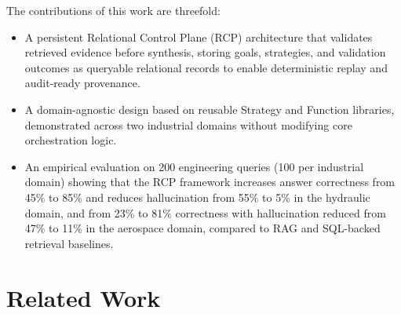 \documentclass[largeformat]{interact}
\begin{document}
\vspace{1em}
\noindent The contributions of this work are threefold:
\begin{itemize}[label=-]
    \item A persistent Relational Control Plane (RCP) architecture that validates retrieved evidence before synthesis, storing goals, strategies, and validation outcomes as queryable relational records to enable deterministic replay and audit-ready provenance.
    \item A domain-agnostic design based on reusable Strategy and Function libraries, demonstrated across two industrial domains without modifying core orchestration logic.
     \item An empirical evaluation on 200 engineering queries (100 per industrial domain) showing that the RCP framework increases answer correctness from 45\% to 85\% and reduces hallucination from 55\% to 5\% in the hydraulic domain, and from 23\% to 81\% correctness with hallucination reduced from 47\% to 11\% in the aerospace domain, compared to RAG and SQL-backed retrieval baselines.
\end{itemize}

\section{Related Work}
\label{sec:related_work}
\end{document}
